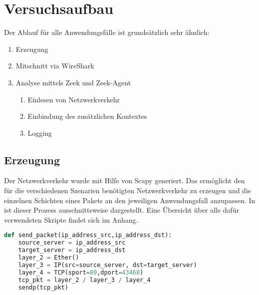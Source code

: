 \section{Versuchsaufbau}
Der Ablauf für alle Anwendungsfälle ist grundsätzlich sehr ähnlich:
\begin{enumerate}
\item{Erzeugung}
\item{Mitschnitt via WireShark}
\item{Analyse mittels Zeek und Zeek-Agent}
\begin{enumerate}
\item{Einlesen von Netzwerkverkehr}
\item{Einbindung des zusätzlichen Kontextes}
\item{Logging}
\end{enumerate}
\end{enumerate}
\subsection{Erzeugung}
Der Netzwerkverkehr wurde mit Hilfe von Scapy generiert. Das ermöglicht den für die verschiedenen Szenarien benötigten Netzwerkverkehr zu erzeugen und die einzelnen Schichten eines Pakets an den jeweiligen Anwendungsfall anzupassen. In ist dieser Prozess ausschnittsweise dargestellt. Eine Übersicht über alle dafür verwendeten Skripte findet sich im Anhang.
\begin{lstlisting}[language=python,caption={Konfiguration und Versendung eines Pakets},firstnumber=6]
def send_packet(ip_address_src,ip_address_dst):
    source_server = ip_address_src
    target_server = ip_address_dst
    layer_2 = Ether()
    layer_3 = IP(src=source_server, dst=target_server)
    layer_4 = TCP(sport=80,dport=43468)
    tcp_pkt = layer_2 / layer_3 / layer_4
    sendp(tcp_pkt)
\end{lstlisting}




